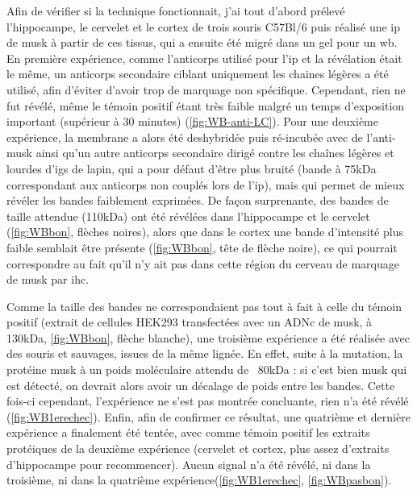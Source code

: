 	Afin de vérifier si la technique fonctionnait, j'ai tout d'abord prélevé l'hippocampe, le cervelet et le cortex de trois souris C57Bl/6 puis réalisé une \gls{ip} de \gls{musk} à partir de ces tissus, qui a ensuite été migré dans un gel pour un \gls{wb}. En première expérience, comme l'anticorps utilisé pour l'\gls{ip} et la révélation était le même, un anticorps secondaire ciblant uniquement les chaines légères a été utilisé, afin d'éviter d'avoir trop de marquage non spécifique. Cependant, rien ne fut révélé, même le témoin positif étant très faible malgré un temps d'exposition important (supérieur à 30 minutes) (\cref{fig:WB-anti-LC}). Pour une deuxième expérience, la membrane a alors été deshybridée puis ré-incubée avec de l'anti-\gls{musk} ainsi qu'un autre anticorps secondaire dirigé contre les chaînes légères et lourdes d'\Glspl{ig} de lapin, qui a pour défaut d'être plus bruité (bande à 75kDa correspondant aux anticorps non couplés lors de l'\gls{ip}), mais qui permet de mieux révéler les bandes faiblement exprimées. De façon surprenante, des bandes de taille attendue (110kDa) ont été révélées dans l'hippocampe et le cervelet (\cref{fig:WBbon}, flèches noires), alors que dans le cortex une bande d'intensité plus faible semblait être présente (\cref{fig:WBbon}, tête de flèche noire), ce qui pourrait correspondre au fait qu'il n'y ait pas dans cette région du cerveau de marquage de \gls{musk} par \gls{ihc}. 
	
	Comme la taille des bandes ne correspondaient pas tout à fait à celle du témoin positif (extrait de cellules HEK293 transfectées avec un ADNc de \gls{musk}, à 130kDa, \cref{fig:WBbon}, flèche blanche), une troisième expérience a été réalisée avec des souris \mcrd et sauvages, issues de la même lignée. En effet, suite à la mutation, la protéine \gls{musk} à un poids moléculaire attendu de ~80kDa : si c'est bien \gls{musk} qui est détecté, on devrait alors avoir un décalage de poids entre les bandes. Cette fois-ci cependant, l'expérience ne s'est pas montrée concluante, rien n'a été révélé (\cref{fig:WB1erechec}). Enfin, afin de confirmer ce résultat, une quatrième et dernière expérience a finalement été tentée, avec comme témoin positif les extraits protéiques de la deuxième expérience (cervelet et cortex, plus assez d'extraits d'hippocampe pour recommencer). Aucun signal n'a été révélé, ni dans la troisième, ni dans la quatrième expérience(\cref{fig:WB1erechec}, \cref{fig:WBpasbon}).
	
